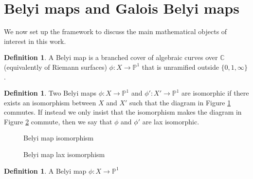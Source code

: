 \documentclass{dcthesis}
\newcommand{\PP}{\mathbb P}
\newcommand{\CC}{\mathbb C}
\newcommand{\defi}[1]{\textsf{#1}}
\numberwithin{equation}{section}
\theoremstyle{definition}
\newtheorem{definition}[equation]{Definition}
\theoremstyle{remark}
\begin{document}
{  \section{Belyi maps and Galois Belyi maps}{\label{sec:belyimaps}
    We now set up the framework to discuss
    the main mathematical objects of interest in this work.
    \begin{definition}\label{def:belyimap}
      A \defi{Belyi map}
      is a branched cover
      of algebraic curves over $\CC$
      (equivalently of Riemann surfaces)
      $\phi\colon X \to \PP^1$
      that is
      unramified outside
      $\{0,1,\infty\}$.
    \end{definition}
    \begin{definition}\label{def:belyiiso}
      Two Belyi maps
      $\phi\colon X\to\PP^1$ and
      $\phi'\colon X'\to\PP^1$
      are \defi{isomorphic}
      if there exists an isomorphism
      between $X$ and $X'$
      such that the diagram in Figure
      \ref{fig:belyiiso}
      commutes.
      If instead we only insist that the isomorphism
      makes the diagram in Figure
      \ref{fig:belyilax} commute,
      then we say that $\phi$ and $\phi'$
      are \defi{lax isomorphic}.
      \begin{figure}[ht]
        \begin{center}
        \end{center}
        \caption{Belyi map isomorphism}
        \label{fig:belyiiso}
      \end{figure}
      \begin{figure}[ht]
        \begin{center}
        \end{center}
        \caption{Belyi map lax isomorphism}
        \label{fig:belyilax}
      \end{figure}
    \end{definition}
    \begin{definition}\label{def:galoisbelyi}
      A Belyi map $\phi\colon X\to\PP^1$

\end{definition}}}
\end{document}
